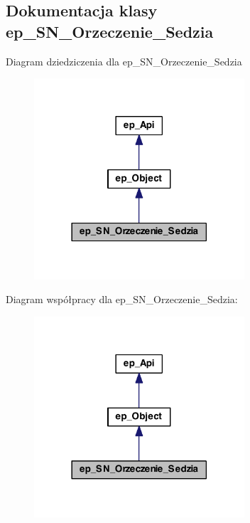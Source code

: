 \hypertarget{classep___s_n___orzeczenie___sedzia}{\subsection{Dokumentacja klasy ep\-\_\-\-S\-N\-\_\-\-Orzeczenie\-\_\-\-Sedzia}
\label{classep___s_n___orzeczenie___sedzia}
}


Diagram dziedziczenia dla ep\-\_\-\-S\-N\-\_\-\-Orzeczenie\-\_\-\-Sedzia\nopagebreak
\begin{figure}[H]
\begin{center}
\leavevmode
\includegraphics[width=222pt]{classep___s_n___orzeczenie___sedzia__inherit__graph}
\end{center}
\end{figure}


Diagram współpracy dla ep\-\_\-\-S\-N\-\_\-\-Orzeczenie\-\_\-\-Sedzia\-:\nopagebreak
\begin{figure}[H]
\begin{center}
\leavevmode
\includegraphics[width=222pt]{classep___s_n___orzeczenie___sedzia__coll__graph}
\end{center}
\end{figure}
